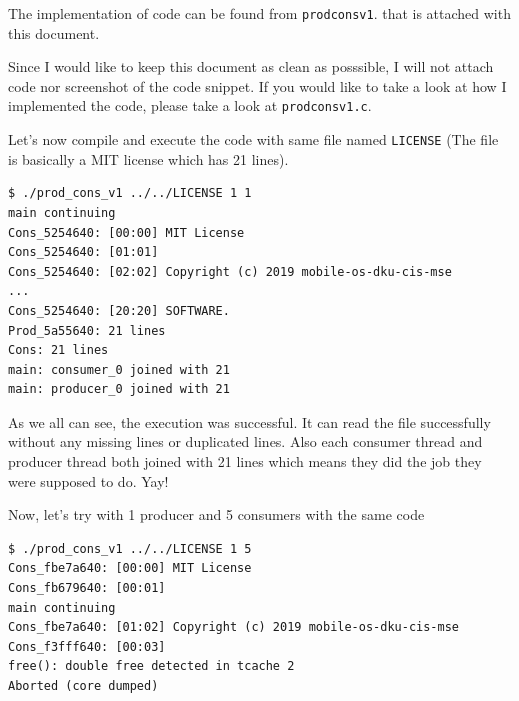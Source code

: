 \documentclass{homework}
\begin{document}
The implementation of code can be found from \texttt{prod\textunderscore cons\textunderscore v1}. that is attached with this document.
\par

Since I would like to keep this document as clean as posssible, I will not attach code nor screenshot of the code snippet. If you would like to take a look at how I implemented the code, please take a look at \texttt{prod\textunderscore cons\textunderscore v1.c}.
\par

Let's now compile and execute the code with same file named \texttt{LICENSE} (The file is basically a MIT license which has 21 lines). 
\\

\begin{center}
\begin{code}
\begin{verbatim}
$ ./prod_cons_v1 ../../LICENSE 1 1
main continuing
Cons_5254640: [00:00] MIT License
Cons_5254640: [01:01]
Cons_5254640: [02:02] Copyright (c) 2019 mobile-os-dku-cis-mse
...
Cons_5254640: [20:20] SOFTWARE.
Prod_5a55640: 21 lines
Cons: 21 lines
main: consumer_0 joined with 21
main: producer_0 joined with 21
\end{verbatim}
\end{code}
\end{center}

As we all can see, the execution was successful. It can read the file successfully without any missing lines or duplicated lines. Also each consumer thread and producer thread both joined with 21 lines which means they did the job they were supposed to do. Yay!
\par
\pagebreak

Now, let's try with 1 producer and 5 consumers with the same code
\\
\begin{center}
\begin{code}
\begin{verbatim}
$ ./prod_cons_v1 ../../LICENSE 1 5
Cons_fbe7a640: [00:00] MIT License
Cons_fb679640: [00:01]
main continuing
Cons_fbe7a640: [01:02] Copyright (c) 2019 mobile-os-dku-cis-mse
Cons_f3fff640: [00:03]
free(): double free detected in tcache 2
Aborted (core dumped)
\end{verbatim}
\end{code}
\end{center}
\end{document}
